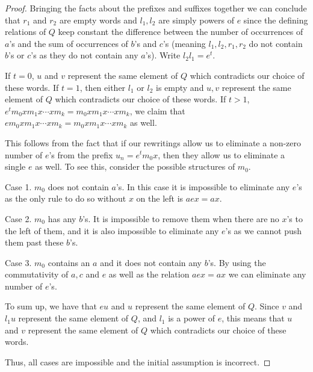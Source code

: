 \documentclass{article}
\theoremstyle{definition}
\begin{document}
\begin{proof}
Bringing the facts about the prefixes and suffixes together we can conclude that $r_1$ and $r_2$ are empty words and $l_1, l_2$ are simply powers of $e$ since the defining relations of $Q$ keep constant the difference between the number of occurrences of $a$'s and the sum of occurrences of $b$'s and $c$'s (meaning $l_1,l_2,r_1,r_2$ do not contain $b$'s or $c$'s as they do not contain any $a$'s). Write $l_2 l_1 = e^t$.

If $t=0$, $u$ and $v$ represent the same element of $Q$ which contradicts our choice of these words. If $t = 1$, then either $l_1$ or $l_2$ is empty and $u,v$ represent the same element of $Q$ which contradicts our choice of these words. If $t > 1$, $e^t m_0 x m_1 x \cdots x m_k = m_0 x m_1 x \cdots x m_k$, we claim that $e m_0 x m_1 x \cdots x m_k = m_0 x m_1 x \cdots x m_k$ as well.

This follows from the fact that if our rewritings allow us to eliminate a non-zero number of $e$'s from the prefix $u_n = e^t m_0 x$, then they allow us to eliminate a single $e$ as well. To see this, consider the possible structures of $m_0$.

Case 1. $m_0$ does not contain $a$'s. In this case it is impossible to eliminate any $e$'s as the only rule to do so without $x$ on the left is $aex = ax$.

Case 2. $m_0$ has any $b$'s. It is impossible to remove them when there are no $x$'s to the left of them, and it is also impossible to eliminate any $e$'s as we cannot push them past these $b$'s.

Case 3. $m_0$ contains an $a$ and it does not contain any $b$'s. By using the commutativity of $a,c$ and $e$ as well as the relation $aex = ax$ we can eliminate any number of $e$'s. 

To sum up, we have that $e u$ and $u$ represent the same element of $Q$. Since $v$  and $l_1 u$ represent the same element of $Q$, and $l_1$ is a power of $e$, this means that $u$ and $v$ represent the same element of $Q$ which contradicts our choice of these words.

Thus, all cases are impossible and the initial assumption is incorrect.
\end{proof}
\end{document}

